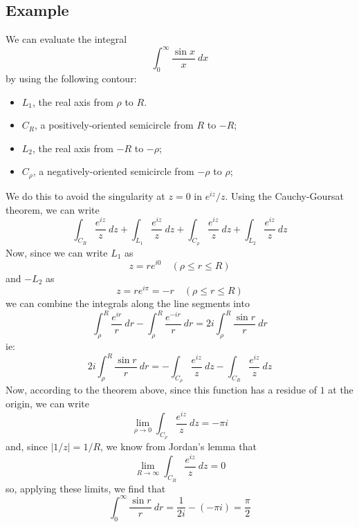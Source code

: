 \documentclass{article}
\begin{document}
\subsection{Example}
We can evaluate the integral
\[
	\int_0^\infty \frac{\sin x}{x}~dx
\]
by using the following contour:
\begin{itemize}
	\item $L_1$, the real axis from $\rho$ to $R$.
	\item $C_R$, a positively-oriented semicircle from $R$ to $-R$;
	\item $L_2$, the real axis from $-R$ to $-\rho$;
	\item $C_\rho$, a negatively-oriented semicircle from $-\rho$ to $\rho$;
\end{itemize}
We do this to avoid the singularity at $z = 0$ in $e^{iz} / z$. Using the Cauchy-Goursat theorem, we can write
\[
	\int_{C_R}      \frac{e^{iz}}{z}~dz
	+ \int_{L_1}    \frac{e^{iz}}{z}~dz
	+ \int_{C_\rho} \frac{e^{iz}}{z}~dz
	+ \int_{L_2}    \frac{e^{iz}}{z}~dz
\]
Now, since we can write $L_1$ as
\[
	z = re^{i0}	\quad (\rho \le r \le R)
\]
and $-L_2$ as
\[
	z = re^{i\pi} = -r \quad (\rho \le r \le R)
\]
we can combine the integrals along the line segments into
\[
	\int_\rho^R \frac{e^{ir}}{r}~dr - \int_\rho^R \frac{e^{-ir}}{r}~dr
	= 2i \int_{\rho}^R \frac{\sin r}{r}~dr
\]
ie:
\[
	2i \int_\rho^R \frac{\sin r}{r}~dr 
	= - \int_{C_\rho} \frac{e^{iz}}{z}~dz
	  - \int_{C_R}    \frac{e^{iz}}{z}~dz
\]
Now, according to the theorem above, since this function has a residue of $1$ at the origin, we can write
\[
	\lim_{\rho \to 0} \int_{C_\rho} \frac{e^{iz}}{z}~dz = -\pi i
\]
and, since $|1 / z| = 1 / R$, we know from Jordan's lemma that
\[
	\lim_{R \to \infty} \int_{C_R} \frac{e^{iz}}{z}~dz = 0
\]
so, applying these limits, we find that
\[
	\int_0^\infty \frac{\sin r}{r}~dr = \frac{1}{2i} -(-\pi i) = \frac{\pi}{2}
\]
\end{document}
